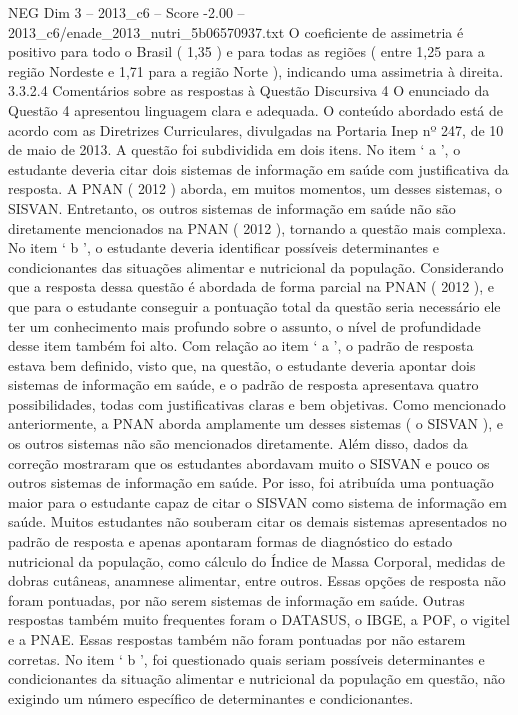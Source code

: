 \begin{textsample}{NEG Dim 3 – 2013\_c6 – Score -2.00 – 2013\_c6/enade\_2013\_nutri\_5b06570937.txt}
O coeficiente de assimetria é positivo para todo o Brasil ( 1,35 ) e para todas as regiões ( entre 1,25 para a região Nordeste e 1,71 para a região Norte ), indicando uma assimetria à direita. 3.3.2.4 Comentários sobre as respostas à Questão Discursiva 4 O enunciado da Questão 4 apresentou linguagem clara e adequada.
O conteúdo abordado está de acordo com as Diretrizes Curriculares, divulgadas na Portaria Inep nº 247, de 10 de maio de 2013.
A questão foi subdividida em dois itens.
No item ‘ a ’, o estudante deveria citar dois sistemas de informação em saúde com justificativa da resposta.
A PNAN ( 2012 ) aborda, em muitos momentos, um desses sistemas, o SISVAN.
Entretanto, os outros sistemas de informação em saúde não são diretamente mencionados na PNAN ( 2012 ), tornando a questão mais complexa.
No item ‘ b ’, o estudante deveria identificar possíveis determinantes e condicionantes das situações alimentar e nutricional da população.
Considerando que a resposta dessa questão é abordada de forma parcial na PNAN ( 2012 ), e que para o estudante conseguir a pontuação total da questão seria necessário ele ter um conhecimento mais profundo sobre o assunto, o nível de profundidade desse item também foi alto.
Com relação ao item ‘ a ’, o padrão de resposta estava bem definido, visto que, na questão, o estudante deveria apontar dois sistemas de informação em saúde, e o padrão de resposta apresentava quatro possibilidades, todas com justificativas claras e bem objetivas.
Como mencionado anteriormente, a PNAN aborda amplamente um desses sistemas ( o SISVAN ), e os outros sistemas não são mencionados diretamente.
Além disso, dados da correção mostraram que os estudantes abordavam muito o SISVAN e pouco os outros sistemas de informação em saúde.
Por isso, foi atribuída uma pontuação maior para o estudante capaz de citar o SISVAN como sistema de informação em saúde.
Muitos estudantes não souberam citar os demais sistemas apresentados no padrão de resposta e apenas apontaram formas de diagnóstico do estado nutricional da população, como cálculo do Índice de Massa Corporal, medidas de dobras cutâneas, anamnese alimentar, entre outros.
Essas opções de resposta não foram pontuadas, por não serem sistemas de informação em saúde.
Outras respostas também muito frequentes foram o DATASUS, o IBGE, a POF, o vigitel e a PNAE.
Essas respostas também não foram pontuadas por não estarem corretas.
No item ‘ b ’, foi questionado quais seriam possíveis determinantes e condicionantes da situação alimentar e nutricional da população em questão, não exigindo um número específico de determinantes e condicionantes.

\end{textsample}
